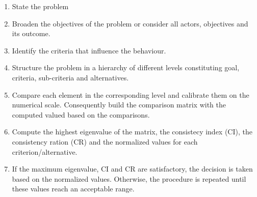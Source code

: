 \begin{enumerate}
\item State the problem
\item Broaden the objectives of the problem or consider all actors, objectives and its outcome.
\item Identify the criteria that influence the behaviour.
\item Structure the problem in a hierarchy of different levels constituting goal, criteria, sub-criteria and alternatives.
\item Compare each element in the corresponding level and calibrate them on the numerical scale. Consequently build the comparison matrix with the computed valued based on the comparisons.
\item Compute the highest eigenvalue of the matrix, the consistecy index (CI), the consistency ration (CR) and the normalized values for each criterion/alternative.
\item If the maximum eigenvalue, CI and CR are satisfactory, the decision is taken based on the normalized values. Otherwise, the procedure is repeated until these values reach an acceptable range.
\end{enumerate}